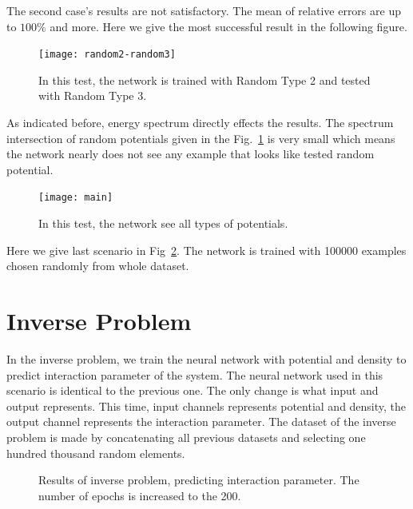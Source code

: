 \documentclass[a4paper,times,hidelinks,12pt]{article}
\begin{document}
The second case's results are not satisfactory. The mean of relative errors are up to $100\%$ and more. Here we give the most successful result in the following figure. 

\graphicspath{{"../figs/training/cross-training/"}}
\begin{figure}[H]
    \centering
    \texttt{[image: random2-random3]}
\caption{In this test, the network is trained with Random Type 2 and tested with Random Type 3.}
\label{fig:cross_training_results}
\end{figure}

As indicated before, energy spectrum directly effects the results. The spectrum intersection of random potentials given in the Fig.~\ref{fig:cross_training_results} is very small which means the network nearly does not see any example that looks like tested random potential.


\graphicspath{{"../figs/training/combined/"}}
\begin{figure}[H]
    \centering
    \texttt{[image: main]}
\caption{In this test, the network see all types of potentials.}
\label{fig:comb_training_results}
\end{figure}

Here we give last scenario in Fig~\ref{fig:comb_training_results}. The network is trained with 100000 examples chosen randomly from whole dataset.  



\section{Inverse Problem}

In the inverse problem, we train the neural network with potential and density to predict interaction parameter of the system. The neural network used in this scenario is identical to the previous one. The only change is what input and output represents. This time, input channels represents potential and density, the output channel represents the interaction parameter. The dataset of the inverse problem is made by concatenating all previous datasets and selecting one hundred thousand random elements. 

\graphicspath{{"../figs/training/interaction/"}}
\begin{figure}[H]
    \centering
\caption{Results of inverse problem, predicting interaction parameter. The number of epochs is increased to the 200. }
\label{fig:inverse_results}
\end{figure}
\end{document}
